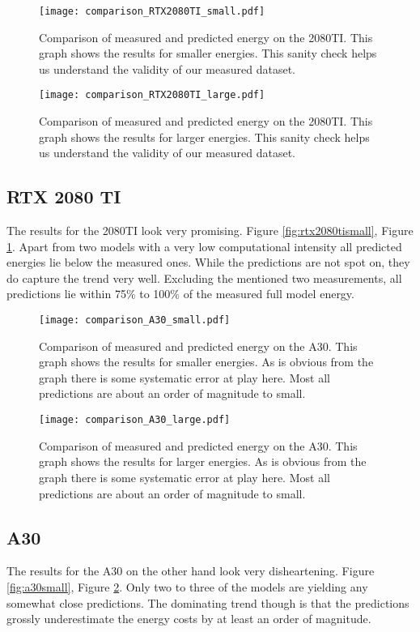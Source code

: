 \documentclass[conference]{IEEEtran}
\begin{document}
\begin{figure}
    \texttt{[image: comparison\_RTX2080TI\_small.pdf]}
    \caption{Comparison of measured and predicted energy on the 2080TI. This graph shows the results for smaller energies. This sanity check helps us understand the validity of our measured dataset.}
    \label{fig:rtx2080tismall}
    \texttt{[image: comparison\_RTX2080TI\_large.pdf]}
    \caption{Comparison of measured and predicted energy on the 2080TI. This graph shows the results for larger energies. This sanity check helps us understand the validity of our measured dataset.}
    \label{fig:rtx2080tilarge}
\end{figure}

\subsection{RTX 2080 TI}
The results for the 2080TI look very promising. Figure \ref{fig:rtx2080tismall}, Figure \ref{fig:rtx2080tilarge}. Apart from two models with a very low computational intensity all predicted energies lie below the measured ones. While the predictions are not spot on, they do capture the trend very well. Excluding the mentioned two measurements, all predictions lie within 75\% to 100\% of the measured full model energy.

\begin{figure}
    \texttt{[image: comparison\_A30\_small.pdf]}
    \caption{Comparison of measured and predicted energy on the A30. This graph shows the results for smaller energies. As is obvious from the graph there is some systematic error at play here. Most all predictions are about an order of magnitude to small.}
    \label{fig:a30small}
    \texttt{[image: comparison\_A30\_large.pdf]}
    \caption{Comparison of measured and predicted energy on the A30. This graph shows the results for larger energies. As is obvious from the graph there is some systematic error at play here. Most all predictions are about an order of magnitude to small.}
    \label{fig:a30large}
\end{figure}

\subsection{A30}
The results for the A30 on the other hand look very disheartening. Figure \ref{fig:a30small}, Figure \ref{fig:a30large}. Only two to three of the models are yielding any somewhat close predictions. The dominating trend though is that the predictions grossly underestimate the energy costs by at least an order of magnitude. 
\end{document}

